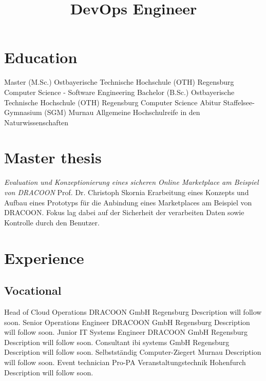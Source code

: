\documentclass[11pt,a4paper,sans,final]{moderncv}
\title				{DevOps Engineer}
\begin{document}
	\makecvtitle
	
	\section{Education}
			{Master (M.Sc.)}	{Ostbayerische Technische Hochschule (OTH)}	{Regensburg}	{}	{Computer Science - Software Engineering}
			{Bachelor (B.Sc.)}	{Ostbayerische Technische Hochschule (OTH)}	{Regensburg}	{}	{Computer Science}
				{Abitur}			{Staffelsee-Gymnasium (SGM)}				{Murnau}		{}	{Allgemeine Hochschulreife in den Naturwissenschaften}
	
	\section{Master thesis}
					{\emph{Evaluation und Konzeptionierung eines sicheren Online Marketplace am Beispiel von \mbox{DRACOON}}}
			{Prof. Dr. Christoph Skornia}
			{Erarbeitung eines Konzepts und Aufbau eines Prototyps für die Anbindung eines Marketplaces am Beispiel von DRACOON. Fokus lag dabei auf der Sicherheit der verarbeiten Daten sowie Kontrolle durch den Benutzer.}
	
	\section{Experience}
	
		\subsection{Vocational}
				{Head of Cloud Operations}							{DRACOON GmbH}					{Regensburg}	{}	{Description will follow soon.}
				{Senior Operations Engineer}						{DRACOON GmbH}					{Regensburg}	{}	{Description will follow soon.}
					{Junior IT Systems Engineer}						{DRACOON GmbH}					{Regensburg}	{}	{Description will follow soon.}
				{Consultant}										{ibi systems GmbH}				{Regensburg}	{}	{Description will follow soon.}
				{Selbstständig}										{Computer-Ziegert}				{Murnau}		{}	{Description will follow soon.}
					{Event technician}									{Pro-PA Veranstaltungstechnik}	{Hohenfurch}	{}	{Description will follow soon.}
	
\end{document}
